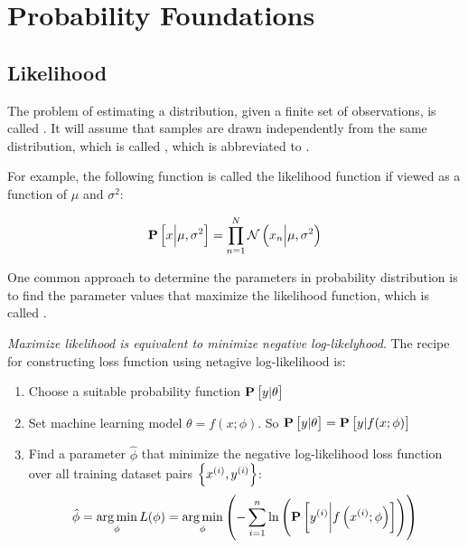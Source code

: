 \chapter{Probability Foundations}


\section{Likelihood}

\begin{definition}
    The problem of estimating a distribution, given a finite set of observations, is called . It will assume that samples are drawn independently from the same distribution, which is called , which is abbreviated to . 
\end{definition}

\begin{definition}
    For example, the following function is called the likelihood function if viewed as a function of $\mu$ and $\sigma^2$:
    
    \begin{equation}
        \mathop{\bf P\/}\left[\displaystyle x \middle| \mu, \sigma^2 \right] = \prod_{n=1}^N \mathcal{N}\left(x_n \middle| \mu,\sigma^2\right)
    \end{equation}
    
    One common approach to determine the parameters in probability distribution is to find the parameter values that maximize the likelihood function, which is called .
\end{definition}

\emph{Maximize likelihood is equivalent to minimize negative log-likelyhood}. The recipe for constructing loss function using netagive log-likelihood is:
\begin{enumerate}
    \item Choose a suitable probability function $\mathop{\bf P\/}\left[\displaystyle y|\theta \right]$
    \item Set machine learning model $\theta = f(x;\phi)$. So $\mathop{\bf P\/}\left[\displaystyle y|\theta \right] = \mathop{\bf P\/}\left[\displaystyle y|f(x;\phi) \right]$
    \item Find a parameter $\hat\phi$ that minimize the negative log-likelihood loss function over all training dataset pairs $\set{{x}^{(i)}, {y}^{(i)}}$: \begin{equation}
        \hat\phi = \mathop{\arg\min}\limits_{\phi} L(\phi) = \mathop{\arg\min}\limits_{\phi} \left( - \sum_{i=1}^n \ln \left(\mathop{\bf P\/}\left[\displaystyle {y}^{(i)} \middle| f\left({x}^{(i)};\phi \right) \right] \right)\right)
    \end{equation}
\end{enumerate}

